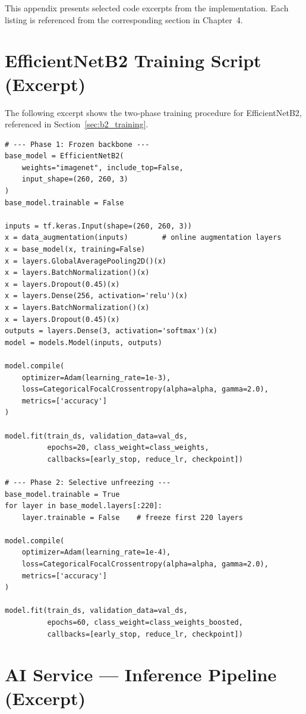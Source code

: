 This appendix presents selected code excerpts from the implementation. Each listing is referenced from the corresponding section in Chapter~4.

\section{EfficientNetB2 Training Script (Excerpt)}
\label{app:training_code}

The following excerpt shows the two-phase training procedure for EfficientNetB2, referenced in Section~\ref{sec:b2_training}.

\begin{verbatim}
# --- Phase 1: Frozen backbone ---
base_model = EfficientNetB2(
    weights="imagenet", include_top=False,
    input_shape=(260, 260, 3)
)
base_model.trainable = False

inputs = tf.keras.Input(shape=(260, 260, 3))
x = data_augmentation(inputs)        # online augmentation layers
x = base_model(x, training=False)
x = layers.GlobalAveragePooling2D()(x)
x = layers.BatchNormalization()(x)
x = layers.Dropout(0.45)(x)
x = layers.Dense(256, activation='relu')(x)
x = layers.BatchNormalization()(x)
x = layers.Dropout(0.45)(x)
outputs = layers.Dense(3, activation='softmax')(x)
model = models.Model(inputs, outputs)

model.compile(
    optimizer=Adam(learning_rate=1e-3),
    loss=CategoricalFocalCrossentropy(alpha=alpha, gamma=2.0),
    metrics=['accuracy']
)

model.fit(train_ds, validation_data=val_ds,
          epochs=20, class_weight=class_weights,
          callbacks=[early_stop, reduce_lr, checkpoint])

# --- Phase 2: Selective unfreezing ---
base_model.trainable = True
for layer in base_model.layers[:220]:
    layer.trainable = False    # freeze first 220 layers

model.compile(
    optimizer=Adam(learning_rate=1e-4),
    loss=CategoricalFocalCrossentropy(alpha=alpha, gamma=2.0),
    metrics=['accuracy']
)

model.fit(train_ds, validation_data=val_ds,
          epochs=60, class_weight=class_weights_boosted,
          callbacks=[early_stop, reduce_lr, checkpoint])
\end{verbatim}

\section{AI Service --- Inference Pipeline (Excerpt)}
\label{app:ai_service}

